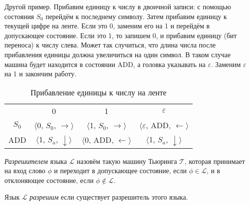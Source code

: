 Другой пример. Прибавим единицу к числу в двоичной записи: с помощью состояния $S_0$ перейдём к последнему
символу. Затем прибавим единицу к текущей цифре на ленте. Если это 0, заменим его на 1 и перейдём в
допускающее состояние. Если это 1, то запишем 0, и прибавим единицу (бит переноса) к числу слева. Может
так случиться, что длина числа после прибавления единицы должна увеличиться на один символ. В таком
случае машина будет находится в состоянии ADD, а головка указывать на $\varepsilon$. Заменим
$\varepsilon$ на 1 и закончим работу.

\begin{table}[h]
    \centering
    \begin{tabular}{c c c c}
        & 0 & 1 & $\varepsilon$ \\
        
        $S_0$ &
        $\langle$0, $S_0$, $\rightarrow\rangle$ & 
        $\langle$1, $S_0$, $\rightarrow\rangle$ & 
        $\langle\varepsilon$, ADD, $\leftarrow\rangle$ \\
        
        ADD &
        $\langle$1, $S_a$, $\downarrow\rangle$ &
        $\langle$0, ADD, $\leftarrow\rangle$ &
        $\langle$1, $S_a$, $\downarrow\rangle$ \\
        
    \end{tabular}
    \caption{Прибавление единицы к числу на ленте}
\end{table}

\begin{definition} \textit{Разрешителем} языка $\mathcal{L}$ назовём такую машину Тьюринга $\mathcal{T}$,
которая принимает на вход слово $\phi$ и переходит в допускающее состояние, если $\phi \in \mathcal{L}$,
и в отклоняющее состояние, если $\phi \notin \mathcal{L}$.
\end{definition} 

\begin{definition} Язык $\mathcal{L}$ \textit{разрешим} если существует разрешитель этого языка.
\end{definition} 


